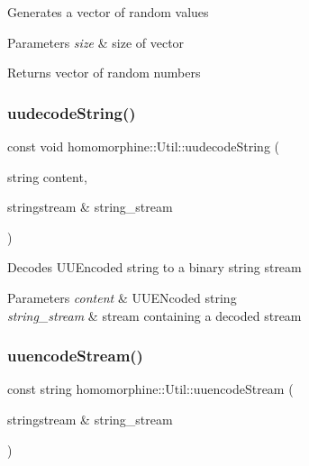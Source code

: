 Generates a vector of random values


\begin{DoxyParams}{Parameters}
{\em size} & size of vector \\
\hline
\end{DoxyParams}
\begin{DoxyReturn}{Returns}
vector of random numbers 
\end{DoxyReturn}
\mbox{\label{classhomomorphine_1_1_util_aba5af6d7356aca8c70ae4fb1e5d36b70}} 
\subsubsection{\texorpdfstring{uudecodeString()}{uudecodeString()}}
{\footnotesize\ttfamily const void homomorphine\+::\+Util\+::uudecode\+String (\begin{DoxyParamCaption}\item[{string}]{content,  }\item[{stringstream \&}]{string\+\_\+stream }\end{DoxyParamCaption})\hspace{0.3cm}{\ttfamily [static]}}

Decodes U\+U\+Encoded string to a binary string stream


\begin{DoxyParams}{Parameters}
{\em content} & U\+U\+E\+Ncoded string \\
\hline
{\em string\+\_\+stream} & stream containing a decoded stream \\
\hline
\end{DoxyParams}
\mbox{\label{classhomomorphine_1_1_util_a26f29995aa48f4374993ec4afeca2ac8}} 
\subsubsection{\texorpdfstring{uuencodeStream()}{uuencodeStream()}}
{\footnotesize\ttfamily const string homomorphine\+::\+Util\+::uuencode\+Stream (\begin{DoxyParamCaption}\item[{stringstream \&}]{string\+\_\+stream }\end{DoxyParamCaption})\hspace{0.3cm}{\ttfamily [static]}}

